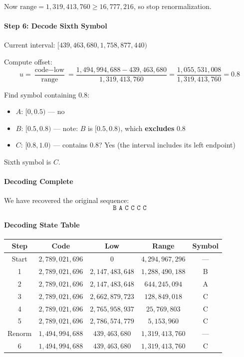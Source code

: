 Now $\text{range} = 1{,}319{,}413{,}760 \ge 16{,}777{,}216$, so stop renormalization.

\paragraph{Step 6: Decode Sixth Symbol}

Current interval: $[439{,}463{,}680, 1{,}758{,}877{,}440)$

Compute offset:
\[
u = \frac{\text{code} - \text{low}}{\text{range}} = \frac{1{,}494{,}994{,}688 - 439{,}463{,}680}{1{,}319{,}413{,}760} = \frac{1{,}055{,}531{,}008}{1{,}319{,}413{,}760} = 0.8
\]

Find symbol containing $0.8$:
\begin{itemize}
    \item $A$: $[0, 0.5)$ — no
    \item $B$: $[0.5, 0.8)$ — note: $B$ is $[0.5, 0.8)$, which \textbf{excludes} $0.8$
    \item $C$: $[0.8, 1.0)$ — contains $0.8$? Yes (the interval includes its left endpoint)
\end{itemize}
Sixth symbol is $C$.

\paragraph{Decoding Complete}

We have recovered the original sequence:
\[
\boxed{\texttt{B A C C C C}}
\]

\paragraph{Decoding State Table}

\begin{center}
\begin{tabular}{c|c|c|c|c}
\hline
\textbf{Step} & \textbf{Code} & \textbf{Low} & \textbf{Range} & \textbf{Symbol} \\ \hline
Start & $2{,}789{,}021{,}696$ & $0$ & $4{,}294{,}967{,}296$ & — \\
1 & $2{,}789{,}021{,}696$ & $2{,}147{,}483{,}648$ & $1{,}288{,}490{,}188$ & B \\
2 & $2{,}789{,}021{,}696$ & $2{,}147{,}483{,}648$ & $644{,}245{,}094$ & A \\
3 & $2{,}789{,}021{,}696$ & $2{,}662{,}879{,}723$ & $128{,}849{,}018$ & C \\
4 & $2{,}789{,}021{,}696$ & $2{,}765{,}958{,}937$ & $25{,}769{,}803$ & C \\
5 & $2{,}789{,}021{,}696$ & $2{,}786{,}574{,}779$ & $5{,}153{,}960$ & C \\
Renorm & $1{,}494{,}994{,}688$ & $439{,}463{,}680$ & $1{,}319{,}413{,}760$ & — \\
6 & $1{,}494{,}994{,}688$ & $439{,}463{,}680$ & $1{,}319{,}413{,}760$ & C \\ \hline
\end{tabular}
\end{center}

